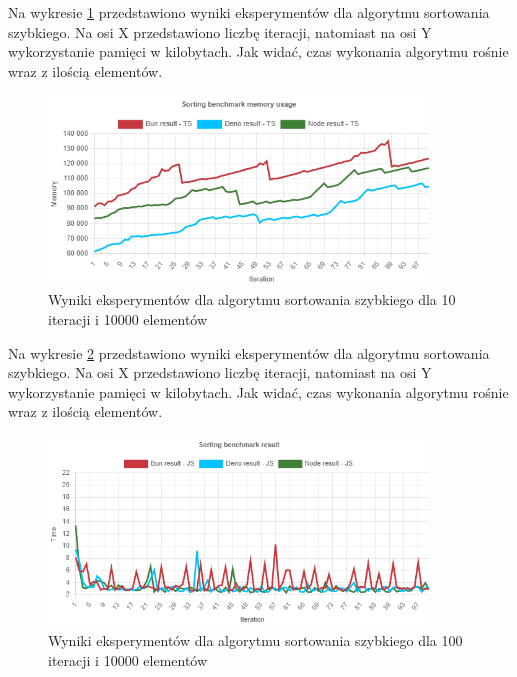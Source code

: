 Na wykresie \ref{fig:quick_sorting_e4_memory_ts} przedstawiono wyniki eksperymentów dla algorytmu sortowania szybkiego. Na osi X przedstawiono liczbę iteracji, natomiast na osi Y wykorzystanie pamięci w kilobytach. Jak widać, czas wykonania algorytmu rośnie wraz z ilością elementów.
\begin{figure}[H]
  \centering
  \includegraphics[width=0.9\textwidth]{Figures/sorting/quick/e4_memory_ts.png}
  \caption{Wyniki eksperymentów dla algorytmu sortowania szybkiego dla 10 iteracji i 10000 elementów}
  \label{fig:quick_sorting_e4_memory_ts}
\end{figure}

Na wykresie \ref{fig:quick_sorting_e5} przedstawiono wyniki eksperymentów dla algorytmu sortowania szybkiego. Na osi X przedstawiono liczbę iteracji, natomiast na osi Y wykorzystanie pamięci w kilobytach. Jak widać, czas wykonania algorytmu rośnie wraz z ilością elementów.
\begin{figure}[H]
  \centering
  \includegraphics[width=0.9\textwidth]{Figures/sorting/quick/e5_js.png}
  \caption{Wyniki eksperymentów dla algorytmu sortowania szybkiego dla 100 iteracji i 10000 elementów}
  \label{fig:quick_sorting_e5}
\end{figure}

